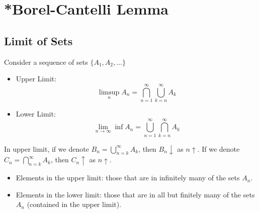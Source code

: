 \chapter{*Borel-Cantelli Lemma}

\section{Limit of Sets}
\begin{definition}
    Consider a sequence of sets $\{A_1, A_2, \ldots\}$
    \begin{itemize}
        \item Upper Limit:
        \begin{equation}
            \limsup_n A_n = \bigcap_{n=1}^{\infty} \bigcup_{k=n}^{\infty} A_k
        \end{equation}
        \item Lower Limit:
        \begin{equation}
            \lim_{n \to \infty} \inf A_n = \bigcup_{n=1}^{\infty} \bigcap_{k=n}^{\infty} A_k
        \end{equation}
    \end{itemize}
\end{definition}
\begin{remark}
    In upper limit, if we denote $B_n = \bigcup_{n=k}^{\infty} A_k$, then $B_n \downarrow$ as $n \uparrow$. If we denote $C_n = \bigcap_{n=k}^{\infty} A_k$, then $C_n \uparrow$ as $n \uparrow$.
    \begin{itemize}
        \item Elements in the upper limit: those that are in infinitely many of the sets $A_n$.
        \item Elements in the lower limit: those that are in all but finitely many of the sets $A_n$ (contained in the upper limit).
    \end{itemize}
\end{remark}


